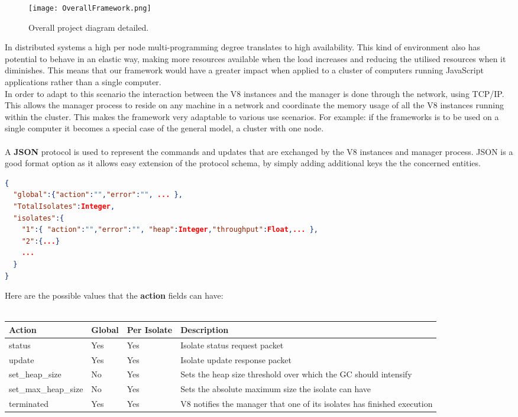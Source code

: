 \documentclass{l4proj}
\begin{document}
\begin{figure}[!ht]
  \centering
    \texttt{[image: OverallFramework.png]}
	\caption{Overall project diagram detailed.}
\end{figure}
\hspace*{3em} In distributed systems a high per node multi-programming degree translates to high availability. This kind of environment also has potential to behave in an elastic way, making more resources available when the load increases and reducing the utilised resources when it diminishes. This means that our framework would have a greater impact when applied to a cluster of computers running JavaScript applications rather than a single computer.\\
\hspace*{3em} In order to adapt to this scenario the interaction between the V8 instances and the manager is done through the network, using TCP/IP. This allows the manager process to reside on any machine in a network and coordinate the memory usage of all the V8 instances running within the cluster. This makes the framework very adaptable to various use scenarios. For example: if the frameworks is to be used on a single computer it becomes a special case of the general model, a cluster with one node.
\\\\
\hspace*{3em} A \textbf{JSON} protocol is used to represent the commands and updates that are exchanged by the V8 instances and manager process. JSON is a good format option as it allows easy extension of the protocol schema, by simply adding additional keys the the concerned entities.
\begin{lstlisting}[language=json,firstnumber=1]
{
  "global":{"action":"","error":"", ... },
  "TotalIsolates":Integer,
  "isolates":{
    "1":{ "action":"","error":"", "heap":Integer,"throughput":Float,... },
    "2":{...}
    ...
  }
}
\end{lstlisting}
Here are the possible values that the \textbf{action} fields can have:\\\\
\begin{tabular}{  l  l  l  l  }
  Action & Global & Per Isolate & Description \\
\hline
  status & Yes & Yes & Isolate status request packet\\
  update & Yes & Yes & Isolate update response packet\\
  set\_heap\_size & No & Yes & Sets the heap size threshold over which the GC should intensify\\
  set\_max\_heap\_size & No & Yes & Sets the absolute maximum size the isolate can have\\
  terminated & Yes & Yes & V8 notifies the manager that one of its isolates has finished execution\\
\hline
\end{tabular}
\end{document}
